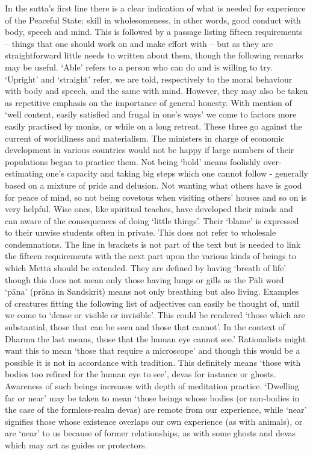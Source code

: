    In the sutta's first line there is a clear indication of what is needed for experience of the Peaceful State: skill in wholesomeness, in other words, good conduct with body, speech and mind. This is followed by a passage listing fifteen requirements – things that one should work on and make effort with – but as they are straightforward little needs to written about them, though the following remarks may be useful. `Able' refers to a person who can do and is willing to try. `Upright' and `straight' refer, we are told, respectively to the moral behaviour with body and speech, and the same with mind. However, they may also be taken as repetitive emphasis on the importance of general honesty. With mention of `well content, easily satisfied and frugal in one's ways' we come to factors more easily practised by monks, or while on a long retreat. These three go against the current of worldliness and materialism. The ministers in charge of economic development in various countries would not be happy if large numbers of their populations began to practice them. Not being `bold' means foolishly over-estimating one's capacity and taking big steps which one cannot follow - generally based on a mixture of pride and delusion. Not wanting what others have is good for peace of mind, so not being covetous when visiting others' houses and so on is very helpful. Wise ones, like spiritual teaches, have developed their minds and can aware of the consequences of doing `little things'. Their `blame' is expressed to their unwise students often in private. This does not refer to wholesale condemnations.
   The line in brackets is not part of the text but is needed to link the fifteen requirements with the next part upon the various kinds of beings to which Mett\=a should be extended. They are defined by having `breath of life' though this does not mean only those having lungs or gills as the P\=ali word `p\=ana' (pr\=ana in Sandskrit) means not only breathing but also living. Examples of creatures fitting the following list of adjectives can easily be thought of, until we come to `dense or visible or invisible'. This could be rendered `those which are substantial, those that can be seen and those that cannot'. In the context of Dharma the last means, those that the human eye cannot see.' Rationalists might want this to mean `those that require a microscope' and though this would be a possible it is not in accordance with tradition. This definitely means `those with bodies too refined for the human eye to see', devas for instance or ghosts. Awareness of such beings increases with depth of meditation practice. `Dwelling far or near' may be taken to mean `those beings whose bodies (or non-bodies in the case of the formless-realm devas) are remote from our experience, while `near' signifies those whose existence overlaps our own experience (as with animals), or are `near' to us because of former relationships, as with some ghosts and devas which may act as guides or protectors.
